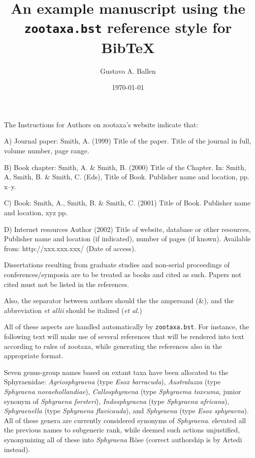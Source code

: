 \documentclass{article}
\author{Gustavo A. Ballen}
\date{\today}
\title{An example manuscript using the \texttt{zootaxa.bst} reference style for Bib\TeX}
\begin{document}
\maketitle

The Instructions for Authors on zootaxa's website indicate that:


    A) Journal paper: 
    Smith, A. (1999) Title of the paper. Title of the journal in full, volume number, page range. 

    B) Book chapter: 
    Smith, A. \& Smith, B. (2000) Title of the Chapter. In: Smith, A, Smith, B. \& Smith, C. (Eds), Title of Book. Publisher name and location, pp. x–y. 

    C) Book: 
    Smith, A., Smith, B. \& Smith, C. (2001) Title of Book. Publisher name and location, xyz pp.

    D) Internet resources
    Author (2002) Title of website, database or other resources, Publisher name and location (if indicated), number of pages (if known). Available from: http://xxx.xxx.xxx/ (Date of access).

Dissertations resulting from graduate studies and non-serial proceedings of conferences/symposia are to be treated as books and cited as such. Papers not cited must not be listed in the references.

Also, the separator between authors should the the ampersand (\&), and the abbreviation \textit{et allii} should be italized (\textit{et al.})

All of these aspects are handled automatically by \texttt{zootaxa.bst}. For instance, the following text will make use of several references that will be rendered into text according to rules of zootaxa, while generating the references also in the appropriate format.

Seven genus-group names based on extant taxa have been allocated to the Sphyraenidae: \textit{Agriosphyraena} \citealp{Fowler1903} (type \textit{Esox barracuda}), \textit{Australuzza} \citealp{Whitley1947} (type \textit{Sphyraena novaehollandiae}), \textit{Callosphyraena} \citealp{Smith1956} (type \textit{Sphyraema toxeuma}, junior synonym of \textit{Sphyraena forsteri}), \textit{Indosphyraena} \citealp{Smith1956} (type \textit{Sphyraena africana}), \textit{Sphyraenella} \citealp{Smith1956} (type \textit{Sphyraena flavicauda}), and \textit{Sphyraena} \citealp{Artedi1793} (type \textit{Esox sphyraena}). All of these genera are currently considered synonyms of \textit{Sphyraena}. \cite{Smith1956} elevated all the previous names to subgeneric rank, while \citet{DeSylva1963} deemed such actions unjustified, synonymizing all of these into \textit{Sphyraena} Röse (correct authorship is by Artedi instead).
\end{document}
